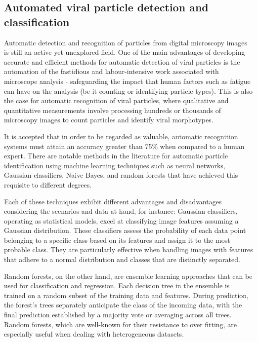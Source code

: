 \documentclass[runningheads]{llncs}
\begin{document}
\subsection{Automated viral particle detection and classification}

Automatic detection and recognition of particles from digital microscopy images is still an active yet unexplored field.
One of the main advantages of developing accurate and efficient methods for automatic detection of viral particles is the automation of the fastidious and labour-intensive work associated with microscope analysis - safeguarding the impact that human factors such as fatigue can have on the analysis (be it counting or identifying particle types).  \cite{glaeser2004}  This is also the case for automatic recognition of viral particles, where qualitative and quantitative measurements involve processing hundreds or thousands of microscopy images to count particles and identify viral morphotypes. \cite{glaeser2004,gelzinis2015}

It is accepted that in order to be regarded as valuable, automatic recognition systems must attain an accuracy greater than 75\% when compared to a human expert. \cite{glaeser2004} There are notable methods in the literature for automatic particle identification using machine learning techniques such as neural networks, Gaussian classifiers, Naive Bayes, and random forests that have achieved this requisite to different degrees. \cite{gelzinis2015,ogura2004,sorzano2009,castanon2007}

Each of these techniques exhibit different advantages and disadvantages considering the scenarios and data at hand, for instance: Gaussian classifiers, operating as statistical models, excel at classifying image features assuming a Gaussian distribution. These classifiers assess the probability of each data point belonging to a specific class based on its features and assign it to the most probable class. They are particularly effective when handling images with features that adhere to a normal distribution and classes that are distinctly separated. \cite{xu2022}

Random forests, on the other hand, are ensemble learning approaches that can be used for classification and regression. Each decision tree in the ensemble is trained on a random subset of the training data and features. During prediction, the forest's trees separately anticipate the class of the incoming data, with the final prediction established by a majority vote or averaging across all trees. Random forests, which are well-known for their resistance to over fitting, are especially useful when dealing with heterogeneous datasets. \cite{caie2021} 
\end{document}
